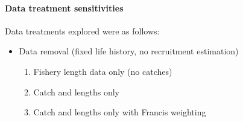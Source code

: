 \documentclass[11pt,
  english,
  a4paper,
]{article}
\begin{document}
\hypertarget{data-treatment-sensitivities}{%
\paragraph{Data treatment sensitivities}\label{data-treatment-sensitivities}}

\leavevmode\tagmcend\tagstructend


Data treatments explored were as follows:

\leavevmode\tagmcend\tagstructend\par


\begin{itemize}
\item

  Data removal (fixed life history, no recruitment estimation)

  \tagmcend\tagstructend\tagstructend


  \begin{enumerate}
  \def\labelenumi{\arabic{enumi}.}
  \item


    Fishery length data only (no catches)

    \tagmcend\tagstructend\tagstructend

    \tagmcend\tagstructend\tagstructend
  \item


    Catch and lengths only

    \tagmcend\tagstructend\tagstructend

    \tagmcend\tagstructend\tagstructend
  \item


    Catch and lengths only with Francis weighting


\end{enumerate}
\end{itemize}
\end{document}
